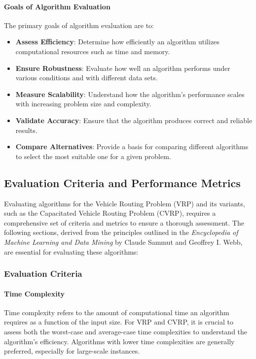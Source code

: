 \documentclass[
]{article}
\begin{document}
  \paragraph{Goals of Algorithm Evaluation}
  The primary goals of algorithm evaluation are to:
  \begin{itemize}
      \item \textbf{Assess Efficiency}: Determine how efficiently an algorithm utilizes computational resources such as time and memory.
      \item \textbf{Ensure Robustness}: Evaluate how well an algorithm performs under various conditions and with different data sets.
      \item \textbf{Measure Scalability}: Understand how the algorithm's performance scales with increasing problem size and complexity.
      \item \textbf{Validate Accuracy}: Ensure that the algorithm produces correct and reliable results.
      \item \textbf{Compare Alternatives}: Provide a basis for comparing different algorithms to select the most suitable one for a given problem.
  \end{itemize}
  
  \subsection{Evaluation Criteria and Performance Metrics}

  Evaluating algorithms for the Vehicle Routing Problem (VRP) and its variants, such as the Capacitated Vehicle Routing Problem (CVRP), requires a comprehensive set of criteria and metrics to ensure a thorough assessment. The following sections, derived from the principles outlined in the \textit{Encyclopedia of Machine Learning and Data Mining} by Claude Sammut and Geoffrey I. Webb, are essential for evaluating these algorithms:
  
  \subsubsection{Evaluation Criteria}
  
  \paragraph{Time Complexity} Time complexity refers to the amount of computational time an algorithm requires as a function of the input size. For VRP and CVRP, it is crucial to assess both the worst-case and average-case time complexities to understand the algorithm’s efficiency. Algorithms with lower time complexities are generally preferred, especially for large-scale instances.
  
\end{document}
